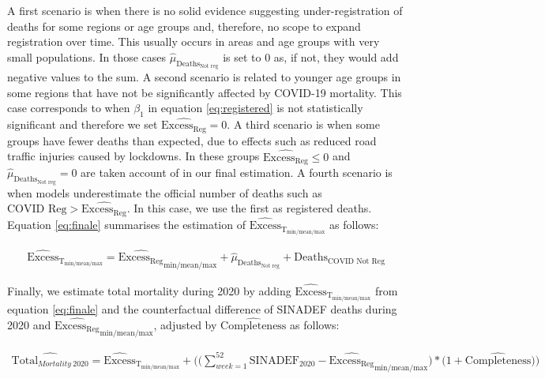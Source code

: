 \documentclass[
]{article}
\begin{document}
A first scenario is when there is no solid evidence suggesting under-registration of deaths for some regions or age groups and, therefore, no scope to expand registration over time. This usually occurs in areas and age groups with very small populations. In those cases \(\widehat{\mu}_{\text{Deaths}_\text{Not reg}}\) is set to 0 as, if not, they would add negative values to the sum. A second scenario is related to younger age groups in some regions that have not be significantly affected by COVID-19 mortality. This case corresponds to when \({\beta_{1}}\) in equation \eqref{eq:registered} is not statistically significant and therefore we set \(\widehat{{\text{Excess}}_\text{Reg}} = 0\). A third scenario is when some groups have fewer deaths than expected, due to effects such as reduced road traffic injuries caused by lockdowns. In these groups \(\widehat{{\text{Excess}}_\text{Reg}}\le 0\) and
\(\widehat{\mu}_{\text{Deaths}_\text{Not reg}} = 0\) are taken account of in our final estimation. A fourth scenario is when models underestimate the official number of deaths such as \(\text{COVID Reg} > \widehat{{\text{Excess}}_\text{Reg}}\). In this case, we use the first as registered deaths. Equation \eqref{eq:finale} summarises the estimation of \(\widehat{\text{Excess}}_{\text{T}_{\text{min/mean/max}}}\) as follows:

\begin{equation}
\label{eq:finale}
  \begin{aligned}
    \widehat{\text{Excess}}_{\text{T}_{\text{min/mean/max}}} =
      \widehat{{\text{Excess}}_\text{Reg}}_{\text{min/mean/max}}  +   
        \widehat{\mu}_{\text{Deaths}_\text{Not reg}}
         +{\text{Deaths}_\text{COVID Not Reg}} 
  \end{aligned}
\end{equation}

Finally, we estimate total mortality during 2020 by adding \(\widehat{\text{Excess}}_{\text{T}_{\text{min/mean/max}}}\) from equation \eqref{eq:finale} and the counterfactual difference of SINADEF deaths during 2020 and \(\widehat{{\text{Excess}}_\text{Reg}}_{\text{min/mean/max}}\), adjusted by \(\widehat{\text{Completeness}}\) as follows:

\begin{equation}
\label{eq:totalmort}
        \begin{aligned}
    \widehat{\text{Total}_{Mortality \ 2020}}=\widehat{\text{Excess}}_{\text{T}_{\text{min/mean/max}}}+\Big(\big(\sum\limits_{week=1}^{52}\text{SINADEF}_{2020}-
    \widehat{{\text{Excess}}_\text{Reg}}_{\text{min/mean/max}}\big)*\big(1+\widehat{\text{Completeness}}\big)\Big)
    \end{aligned} 
\end{equation}
\end{document}
